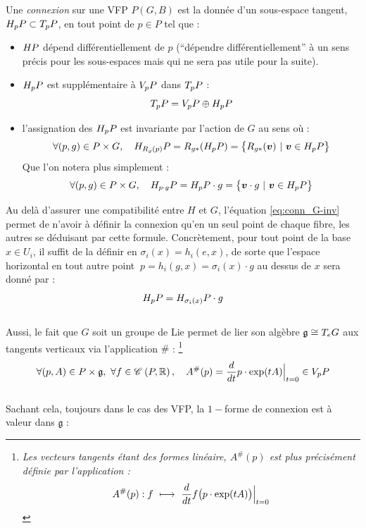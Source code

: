 \begin{definition} \label{def:connexion2VFP}
	Une \emph{connexion} sur une VFP $P(G,B)$ est la donnée d'un sous-espace tangent, $\hg[p]{P}\subset \tg[p]{P}$, en tout point de $p\in P$ tel que :
	\begin{itemize}
		
		\item $\hg{P}$ dépend différentiellement de $p$ (``dépendre différentiellement'' à un sens précis pour les sous-espaces mais qui ne sera pas utile pour la suite).
		
		\item $\hg[p]{P}$ est supplémentaire à $\vg[p]{P}$ dans $\tg[p]{P}$ :
		\begin{equation}\label{eq:TP=V+H}
			\tg[p]{P} = \vg[p]{P} \oplus \hg[p]{P}
		\end{equation}
		
		\item l'assignation des $\hg[p]{P}$ est invariante par l'action de $G$ au sens où :
		\begin{equation}\label{eq:conn_G-inv}
			\forall (p,g)\in P\times G,\quad \hg[R_g(p)]{P} = R_{g*} (\hg[p]{P}) = \big\{R_{g*}(\bf{v})\ |\ \bf{v} \in \hg[p]{P} \big\}
		\end{equation}
		Que l'on notera plus simplement  :
		\begin{equation}
		\forall (p,g)\in P\times G,\quad \hg[p\cdot g]{P} = \hg[p]{P}\cdot g = \big\{\bf{v}\cdot g\ |\ \bf{v} \in \hg[p]{P} \big\}
		\end{equation}
	\end{itemize}
\end{definition}
\skipl

Au delà d'assurer une compatibilité entre $H$ et $G$, l'équation \eqref{eq:conn_G-inv} permet de n'avoir à définir la connexion qu'en un seul point de chaque fibre, les autres se déduisant par cette formule. 
Concrètement, pour tout point de la base $x\in U_i$, il suffit de la définir en $\sigma_i(x) = h_i(e, x)$, de sorte que l'espace horizontal en tout autre point $\ p=h_i(g, x) = \sigma_i(x)\cdot g$ au dessus de $x$ sera donné par :
\[\hg[p]{P} = \hg[\sigma_i(x)]{P}\cdot g\]
\\
Aussi, le fait que $G$ soit un groupe de Lie permet de lier son algèbre $\mathfrak{g}\cong \tg[e]{G}$ aux tangents verticaux via l'application $\#$ : \footnote{\itshape 
	Les vecteurs tangents étant des formes linéaire, $A^\#(p)$ est plus précisément définie par l'application :
	\[A^\#(p) : f\ \lmt\  \frac{d}{dt} f\big( p\cdot \exp(tA) \big)\Big|_{t=0}\]}
\[\forall (p,A)\in P\times \mathfrak{g},\ \forall f\in\conti{P}{\R},\quad A^\#(p) = \frac{d}{dt} p\cdot \exp(tA) \Big|_{t=0}\in\vg[p]{P}\]
\\
Sachant cela, toujours dans le cas des VFP, la $1-$forme de connexion est à valeur dans $\mathfrak{g}$ :

